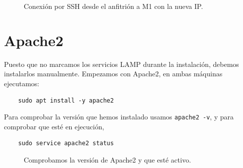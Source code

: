 \documentclass{article}
\begin{document}
\begin{figure}[H]
	\centering
	\caption{Conexión por SSH desde el anfitrión a M1 con la nueva IP.}
	\label{fig:static-ip}
\end{figure}

\section{Apache2}

Puesto que no marcamos los servicios LAMP durante la instalación, debemos instalarlos manualmente. Empezamos con Apache2, en ambas máquinas ejecutamos:
\begin{verbatim}
	sudo apt install -y apache2
\end{verbatim}

Para comprobar la versión que hemos instalado usamos \texttt{apache2 -v}, y para comprobar que esté en ejecución, 
\begin{verbatim}
	sudo service apache2 status
\end{verbatim}

\begin{figure}[H]
	\centering
	\caption{Comprobamos la versión de Apache2 y que esté activo.}
	\label{fig:apache2}
\end{figure}
\end{document}
